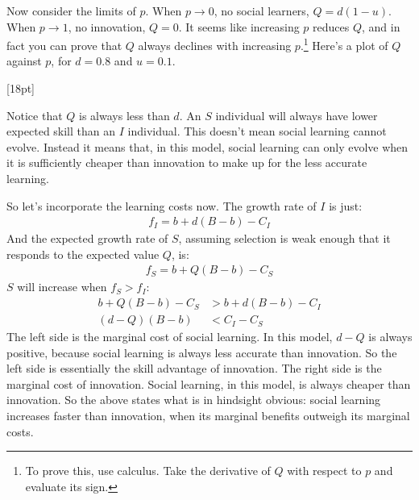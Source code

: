 \documentclass[10pt,reqno]{amsbook}
\newcommand{\margincap}[2][10pt]{\marginnote{\small\emph{#2}}[#1]}
\newcounter{myfigure}[chapter]
\newcommand{\figmarlab}[2][18pt]{%
  \refstepcounter{myfigure}%
  \label{#2}%
  \margincap[#1]{Figure\\\thechapter.\themyfigure}%
}
\numberwithin{equation}{chapter}
\newcommand{\noi}{\noindent}
\begin{document}
Now consider the limits of $p$. When $p \rightarrow 0$, no social learners, $Q = d(1-u)$. When $p \rightarrow 1$, no innovation, $Q=0$. It seems like increasing $p$ reduces $Q$, and in fact you can prove that $Q$ always declines with increasing $p$.\footnote{To prove this, use calculus. Take the derivative of $Q$ with respect to $p$ and evaluate its sign.} Here's a plot of $Q$ against $p$, for $d=0.8$ and $u=0.1$.

\vspace{-6pt}
\figmarlab{figSl1}
\begin{center}
\end{center}

\noi Notice that $Q$ is always less than $d$. An $S$ individual will always have lower expected skill than an $I$ individual. This doesn't mean social learning cannot evolve. Instead it means that, in this model, social learning can only evolve when it is sufficiently cheaper than innovation to make up for the less accurate learning.

So let's incorporate the learning costs now. The growth rate of $I$ is just:
\begin{align*}
	f_I = b+d(B-b) - C_I
\end{align*}
And the expected growth rate of $S$, assuming selection is weak enough that it responds to the expected value $Q$, is:
\begin{align*}
	f_S = b+Q(B-b) - C_S
\end{align*}
$S$ will increase when $f_S > f_I$:
\begin{align*}
	b + Q(B-b) - C_S &> b + d(B-b) - C_I \\
	(d-Q)(B-b) &< C_I - C_S
\end{align*}
The left side is the marginal cost of social learning. In this model, $d-Q$ is always positive, because social learning is always less accurate than innovation. So the left side is essentially the skill advantage of innovation. The right side is the marginal cost of innovation. Social learning, in this model, is always cheaper than innovation. So the above states what is in hindsight obvious: social learning increases faster than innovation, when its marginal benefits outweigh its marginal costs. 
\end{document}
